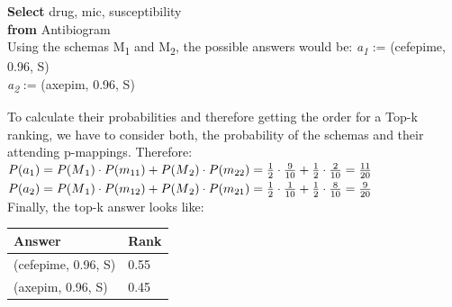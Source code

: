\textbf{Select} drug, mic, susceptibility\\
\textbf{from } Antibiogram\newline\\

Using the schemas M\textsubscript{1} and M\textsubscript{2}, the possible answers would be:
\textit{a\textsubscript{1}} := (cefepime, 0.96, S)\\
\textit{a\textsubscript{2}} :=  (axepim, 0.96, S)\\
\raggedright
To calculate their probabilities and therefore getting the order for a Top-k ranking, we have to consider both, the probability of the schemas and their attending p-mappings. Therefore:\\
$P(a\textsubscript{1}) = P(M\textsubscript{1}) \cdot P(m\textsubscript{11}) + P(M\textsubscript{2}) \cdot P(m\textsubscript{22}) = \frac{1}{2} \cdot \frac{9}{10} + \frac{1}{2} \cdot \frac{2}{10} = \frac{11}{20}$\newline
$P(a\textsubscript{2}) = P(M\textsubscript{1}) \cdot P(m\textsubscript{12}) + P(M\textsubscript{2}) \cdot P(m\textsubscript{21}) = \frac{1}{2} \cdot \frac{1}{10} + \frac{1}{2} \cdot \frac{8}{10} = \frac{9}{20}$\newline
\\
Finally, the top-k answer looks like:\\
{
\centering
\begin{tabular}{|p{}|p{}|}
\hline
 \textbf{Answer}  &  \textbf{Rank}\\ \hline
  (cefepime, 0.96, S)  &  0.55 \\ \hline
  (axepim, 0.96, S)  &   0.45\\ \hline
 \hline
\end{tabular}
\label{query-answer-top-k}
}